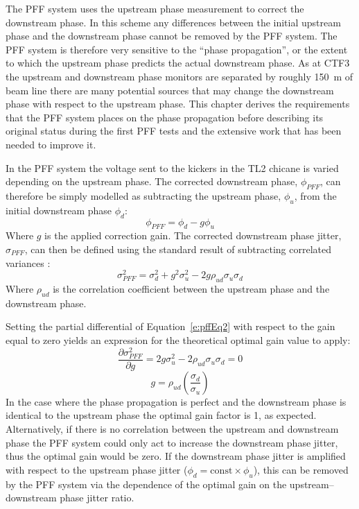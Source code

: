 
The PFF system uses the upstream phase measurement to correct the downstream phase. In this scheme any differences between the initial upstream phase and the downstream phase cannot be removed by the PFF system. The PFF system is therefore very sensitive to the ``phase propagation'', or the extent to which the upstream phase predicts the actual downstream phase. As at CTF3 the upstream and downstream phase monitors are separated by roughly 150~m of beam line there are many potential sources that may change the downstream phase with respect to the upstream phase. This chapter derives the requirements that the PFF system places on the phase propagation before describing its original status during the first PFF tests and the extensive work that has been needed to improve it.


In the PFF system the voltage sent to the kickers in the TL2 chicane is varied depending on the upstream phase. The corrected downstream phase, \(\phi_{PFF}\), can therefore be simply modelled as subtracting the upstream phase, \(\phi_u\), from the initial downstream phase \(\phi_d\):
\begin{equation}
\phi_{PFF} = \phi_d - g\phi_u
\label{e:pffEq1}
\end{equation}
Where \(g\) is the applied correction gain. The corrected downstream phase jitter, \(\sigma_{PFF}\), can then be defined using the standard result of subtracting correlated variances \cite{sumVar}:
\begin{equation}
\sigma_{PFF}^2 = \sigma_d^2 + g^2\sigma_u^2 - 2g\rho_{ud}\sigma_u\sigma_d
\label{e:pffEq2}
\end{equation}
Where \(\rho_{ud}\) is the correlation coefficient between the upstream phase and the downstream phase. 

Setting the partial differential of Equation~\ref{e:pffEq2} with respect to the gain equal to zero yields an expression for the theoretical optimal gain value to apply:
\begin{equation}
\frac{\partial \sigma_{PFF}^2}{\partial g} = 2g\sigma_u^2 - 2\rho_{ud}\sigma_u\sigma_d = 0
\end{equation}
\begin{equation}
g = \rho_{ud}\left(\frac{\sigma_d}{\sigma_u}\right)
\label{e:theoretOptGain}
\end{equation}
In the case where the phase propagation is perfect and the downstream phase is identical to the upstream phase the optimal gain factor is 1, as expected. Alternatively, if there is no correlation between the upstream and downstream phase the PFF system could only act to increase the downstream phase jitter, thus the optimal gain would be zero. If the downstream phase jitter is amplified with respect to the upstream phase jitter (\(\phi_d = \mathrm{const}\times\phi_u\)), this can be removed by the PFF system via the dependence of the optimal gain on the upstream--downstream phase jitter ratio.

